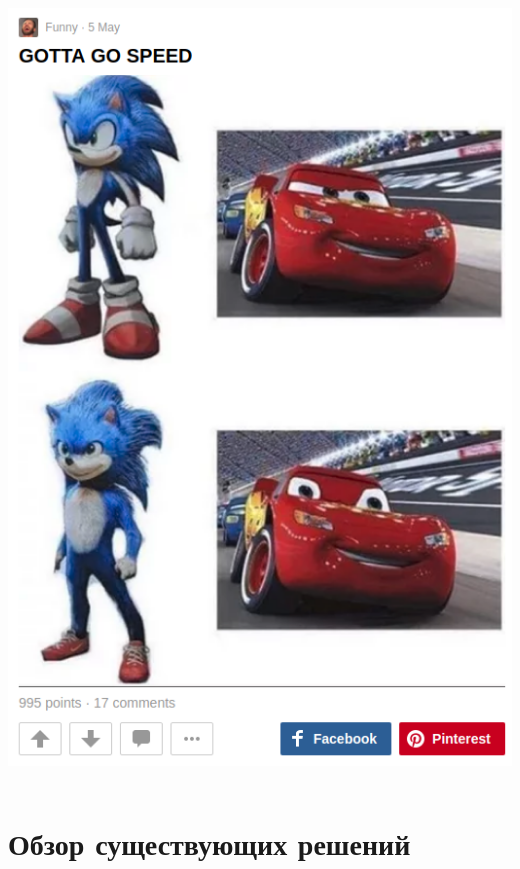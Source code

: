 \documentclass{beamer}
\begin{document}
\begin{frame}
\begin{columns}[c]
		\centerline{\includegraphics[scale=0.28]{images/meme.png}}
	\end{columns}
\end{frame}

\section{Обзор существующих решений}
\end{document}
